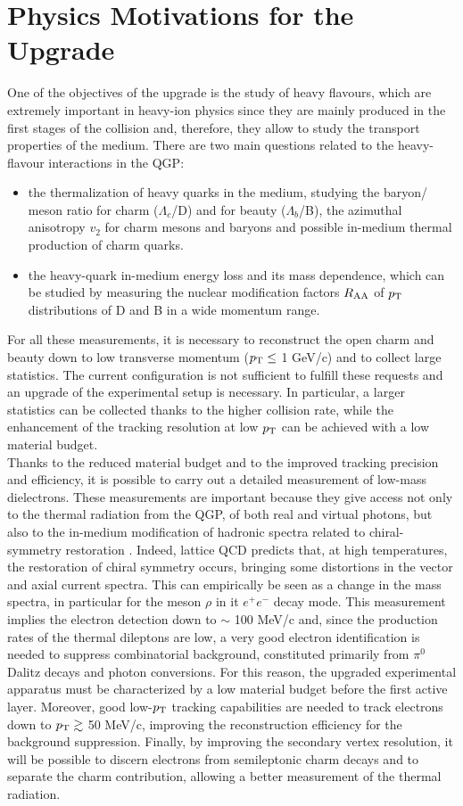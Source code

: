 \section{Physics Motivations for the Upgrade}
One of the objectives of the upgrade is the study of heavy flavours, which are extremely important in heavy-ion physics since they are mainly produced in the first stages of the collision and, therefore, they allow to study the transport properties of the medium. There are two main questions related to the heavy-flavour interactions in the QGP:
\begin{itemize}
 \item the thermalization of heavy quarks in the medium, studying the baryon/ meson ratio for charm ($\Lambda_{c}$/D) and for beauty ($\Lambda_{b}$/B), the azimuthal anisotropy $v_2$ for charm mesons and baryons and possible in-medium thermal production of charm quarks.
 \item the heavy-quark in-medium energy loss and its mass dependence, which can be studied by measuring the nuclear modification factors $R_{\mathrm{AA}}$ of $p_\text{T}$ distributions of D and B in a wide momentum range.
\end{itemize}
For all these measurements, it is necessary to reconstruct the open charm and beauty down to low transverse momentum ($p_\text{T} \leq$ 1 GeV/c) and to collect large statistics. The current configuration is not sufficient to fulfill these requests and an upgrade of the experimental setup is necessary. In particular, a larger statistics can be collected thanks to the higher collision rate, while the enhancement of the tracking resolution at low $p_\text{T}$ can be achieved with a low material budget.\\
Thanks to the reduced material budget and to the improved tracking precision and efficiency, it is possible to carry out a detailed measurement of low-mass dielectrons. These measurements are important because they give access not only to the thermal radiation from the QGP, of both real and virtual photons, but also to the in-medium modification of hadronic spectra related to chiral-symmetry restoration \cite{chiral}. Indeed, lattice QCD predicts that, at high temperatures, the restoration of chiral symmetry occurs, bringing some distortions in the vector and axial current spectra. This can empirically be seen as a change in the mass spectra, in particular for the meson $\rho$ in it $e^+e^-$ decay mode. This measurement implies the electron detection down to $\sim$ 100 MeV/c and, since the production rates of the thermal dileptons are low, a very good electron identification is needed to suppress combinatorial background, constituted primarily from $\pi^0$ Dalitz decays and photon conversions. For this reason, the upgraded experimental apparatus must be characterized by a low material budget before the first active layer. Moreover, good low-$p_\text{T}$ tracking capabilities are needed to track electrons down to $p_\text{T} \gtrsim $ 50 MeV/c, improving the reconstruction efficiency for the background suppression. Finally, by improving the secondary vertex resolution, it will be possible to discern electrons from semileptonic charm decays and to separate the charm contribution, allowing a better measurement of the thermal radiation.\\
